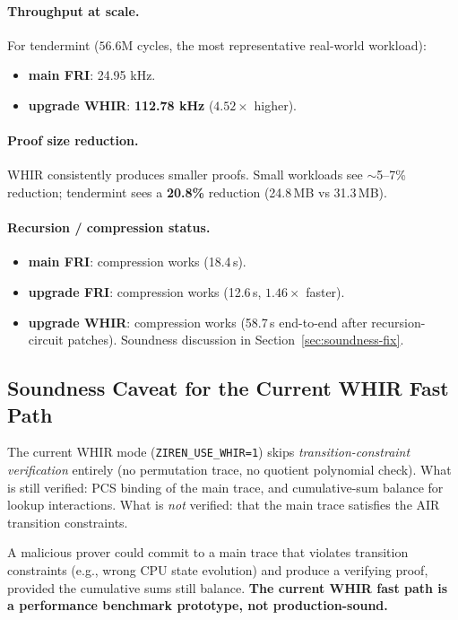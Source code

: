 \paragraph{Throughput at scale.}
For tendermint ($56.6\mathrm{M}$ cycles, the most representative real-world
workload):
\begin{itemize}
  \item \textbf{main FRI}: 24.95 kHz.
  \item \textbf{upgrade WHIR}: \textbf{112.78 kHz} ($4.52\times$ higher).
\end{itemize}

\paragraph{Proof size reduction.}
WHIR consistently produces smaller proofs. Small workloads see $\sim$5--7\%
reduction; tendermint sees a \textbf{20.8\%} reduction (24.8\,MB vs 31.3\,MB).

\paragraph{Recursion / compression status.}
\begin{itemize}
  \item \textbf{main FRI}: compression works (18.4\,s).
  \item \textbf{upgrade FRI}: compression works (12.6\,s, $1.46\times$ faster).
  \item \textbf{upgrade WHIR}: compression works (58.7\,s end-to-end after
        recursion-circuit patches). Soundness discussion in
        Section~\ref{sec:soundness-fix}.
\end{itemize}

\subsection{Soundness Caveat for the Current WHIR Fast Path}
\label{subsec:whir-soundness-caveat}

The current WHIR mode (\texttt{ZIREN\_USE\_WHIR=1}) skips
\emph{transition-constraint verification} entirely (no permutation trace, no
quotient polynomial check). What is still verified: PCS binding of the main
trace, and cumulative-sum balance for lookup interactions. What is
\emph{not} verified: that the main trace satisfies the AIR transition
constraints.

A malicious prover could commit to a main trace that violates transition
constraints (e.g., wrong CPU state evolution) and produce a verifying proof,
provided the cumulative sums still balance. \textbf{The current WHIR fast
path is a performance benchmark prototype, not production-sound.}

